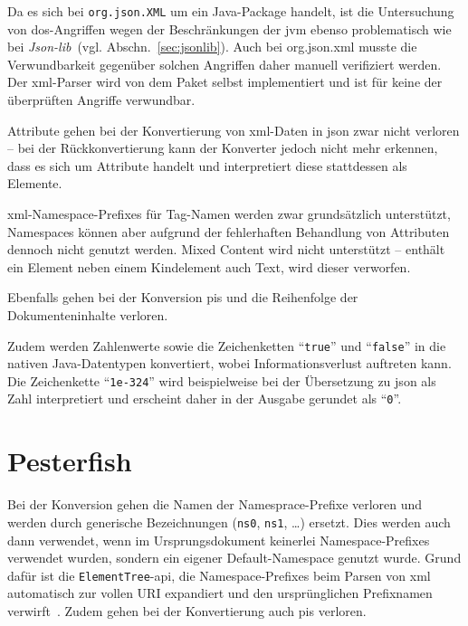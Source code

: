 Da es sich bei \texttt{org.json.XML} um ein Java-Package handelt, ist die Untersuchung von \acrshort{dos}-Angriffen wegen der Beschränkungen der \acrlong{jvm} ebenso problematisch wie bei \emph{Json-lib}~(vgl. Abschn.~\ref{sec:jsonlib}). Auch bei org.json.\acrshort{xml} musste die Verwundbarkeit gegenüber solchen Angriffen daher manuell verifiziert werden. Der \acrshort{xml}-Parser wird von dem Paket selbst implementiert und ist für keine der überprüften Angriffe verwundbar.

Attribute gehen bei der Konvertierung von \acrshort{xml}-Daten in \acrshort{json} zwar nicht verloren -- bei der Rückkonvertierung kann der Konverter jedoch nicht mehr erkennen, dass es sich um Attribute handelt und interpretiert diese stattdessen als Elemente.

\acrshort{xml}-Namespace-Prefixes für Tag-Namen werden zwar grundsätzlich unterstützt, Namespaces können aber aufgrund der fehlerhaften Behandlung von Attributen dennoch nicht genutzt werden.
 Mixed Content wird nicht unterstützt -- enthält ein Element neben einem Kindelement auch Text, wird dieser verworfen.

Ebenfalls gehen bei der Konversion \glspl{pi} und die Reihenfolge der Dokumenteninhalte verloren.

Zudem werden Zahlenwerte sowie die Zeichenketten \enquote{\texttt{true}} und \enquote{\texttt{false}} in die nativen Java-Datentypen konvertiert, wobei Informationsverlust auftreten kann. Die Zeichenkette \enquote{\texttt{1e-324}} wird beispielweise bei der Übersetzung zu \acrshort{json} als Zahl interpretiert und erscheint daher in der Ausgabe gerundet als \enquote{\texttt{0}}.

\section{Pesterfish}
\label{sec:pesterfish}

Bei der Konversion gehen die Namen der Namesprace-Prefixe verloren und werden durch generische Bezeichnungen (\texttt{ns0}, \texttt{ns1}, \dots{}) ersetzt. Dies werden auch dann verwendet, wenn im Ursprungsdokument keinerlei Namespace-Prefixes verwendet wurden, sondern ein eigener Default-Namespace genutzt wurde. Grund dafür ist die \texttt{Element}\-\texttt{Tree}-\acrshort{api}, die Namespace-Prefixes beim Parsen von \acrshort{xml} automatisch zur vollen URI expandiert und den ursprünglichen Prefixnamen verwirft~\cite[Abschn.~20.5.1.7]{pythonetreexmlns}.
Zudem gehen bei der Konvertierung auch \glspl{pi} verloren.

